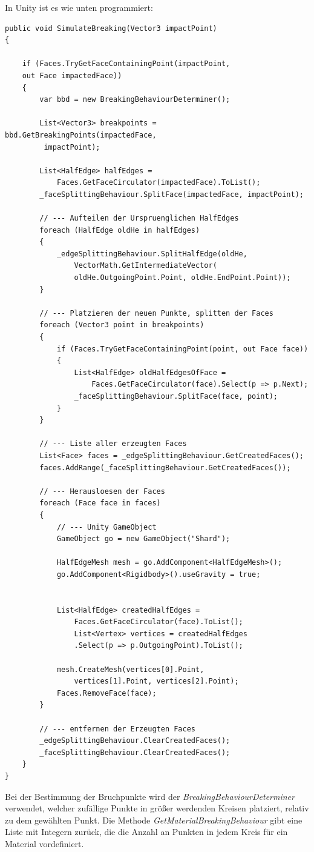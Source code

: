 In Unity ist es wie unten programmiert:
\begin{lstlisting}
public void SimulateBreaking(Vector3 impactPoint)
{

	if (Faces.TryGetFaceContainingPoint(impactPoint, 
	out Face impactedFace))
	{
		var bbd = new BreakingBehaviourDeterminer();

		List<Vector3> breakpoints = bbd.GetBreakingPoints(impactedFace,
		 impactPoint);
		 
		List<HalfEdge> halfEdges =
			Faces.GetFaceCirculator(impactedFace).ToList();
		_faceSplittingBehaviour.SplitFace(impactedFace, impactPoint);

		// --- Aufteilen der Urspruenglichen HalfEdges
		foreach (HalfEdge oldHe in halfEdges)
		{
			_edgeSplittingBehaviour.SplitHalfEdge(oldHe,
				VectorMath.GetIntermediateVector(
				oldHe.OutgoingPoint.Point, oldHe.EndPoint.Point));
		}

		// --- Platzieren der neuen Punkte, splitten der Faces
		foreach (Vector3 point in breakpoints)
		{
			if (Faces.TryGetFaceContainingPoint(point, out Face face))
			{
				List<HalfEdge> oldHalfEdgesOfFace = 
					Faces.GetFaceCirculator(face).Select(p => p.Next);
				_faceSplittingBehaviour.SplitFace(face, point);
			}
		}
	
		// --- Liste aller erzeugten Faces
		List<Face> faces = _edgeSplittingBehaviour.GetCreatedFaces();
		faces.AddRange(_faceSplittingBehaviour.GetCreatedFaces());
	
		// --- Herausloesen der Faces
		foreach (Face face in faces)
		{
			// --- Unity GameObject
			GameObject go = new GameObject("Shard");
	
			HalfEdgeMesh mesh = go.AddComponent<HalfEdgeMesh>();
			go.AddComponent<Rigidbody>().useGravity = true;
	
	
			List<HalfEdge> createdHalfEdges = 
				Faces.GetFaceCirculator(face).ToList();
				List<Vertex> vertices = createdHalfEdges
				.Select(p => p.OutgoingPoint).ToList();
	
			mesh.CreateMesh(vertices[0].Point, 
				vertices[1].Point, vertices[2].Point);
			Faces.RemoveFace(face);
		}
		
		// --- entfernen der Erzeugten Faces
		_edgeSplittingBehaviour.ClearCreatedFaces();
		_faceSplittingBehaviour.ClearCreatedFaces();
	}
}
\end{lstlisting}
Bei der Bestimmung der Bruchpunkte wird der \textit{BreakingBehaviourDeterminer} verwendet, welcher zuf\"allige Punkte in gr\"o{\ss}er werdenden Kreisen platziert, relativ zu dem gew\"ahlten Punkt. Die Methode \textit{GetMaterialBreakingBehaviour} gibt eine Liste mit Integern zur\"uck, die die Anzahl an Punkten in jedem Kreis f\"ur ein Material vordefiniert.

